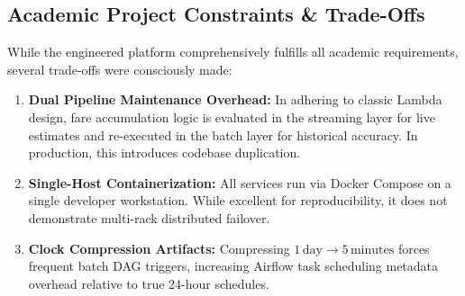 \documentclass[11pt,a4paper]{article}
\begin{document}
\subsection{Academic Project Constraints \& Trade-Offs}
While the engineered platform comprehensively fulfills all academic requirements, several trade-offs were consciously made:
\begin{enumerate}
    \item \textbf{Dual Pipeline Maintenance Overhead:} In adhering to classic Lambda design, fare accumulation logic is evaluated in the streaming layer for live estimates and re-executed in the batch layer for historical accuracy. In production, this introduces codebase duplication.
    \item \textbf{Single-Host Containerization:} All services run via Docker Compose on a single developer workstation. While excellent for reproducibility, it does not demonstrate multi-rack distributed failover.
    \item \textbf{Clock Compression Artifacts:} Compressing $1\,\text{day} \to 5\,\text{minutes}$ forces frequent batch DAG triggers, increasing Airflow task scheduling metadata overhead relative to true 24-hour schedules.
\end{enumerate}
\end{document}
